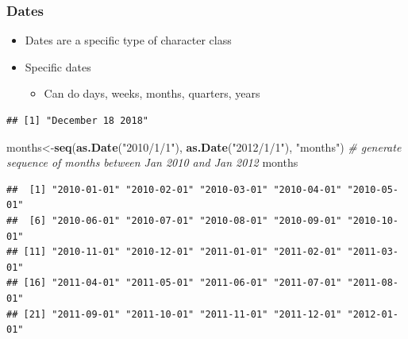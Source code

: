 \documentclass[]{book}
\newenvironment{Shaded}{\begin{snugshade}}{\end{snugshade}}
\newcommand{\KeywordTok}[1]{\textcolor[rgb]{0.13,0.29,0.53}{\textbf{#1}}}
\newcommand{\DataTypeTok}[1]{\textcolor[rgb]{0.13,0.29,0.53}{#1}}
\newcommand{\StringTok}[1]{\textcolor[rgb]{0.31,0.60,0.02}{#1}}
\newcommand{\CommentTok}[1]{\textcolor[rgb]{0.56,0.35,0.01}{\textit{#1}}}
\newcommand{\NormalTok}[1]{#1}
\providecommand{\tightlist}{%
  \setlength{\itemsep}{0pt}\setlength{\parskip}{0pt}}
\theoremstyle{definition}
\theoremstyle{definition}
\theoremstyle{definition}
\theoremstyle{remark}
\begin{document}
\subsubsection{Dates}\label{dates}

\begin{itemize}
\tightlist
\item
  Dates are a specific type of character class
\item
  Specific dates

  \begin{itemize}
  \tightlist
  \item
    Can do days, weeks, months, quarters, years
  \end{itemize}
\end{itemize}

\begin{Shaded}
\end{Shaded}

\begin{verbatim}
## [1] "December 18 2018"
\end{verbatim}

\begin{Shaded}
\begin{Highlighting}[]
\NormalTok{months<-}\KeywordTok{seq}\NormalTok{(}\KeywordTok{as.Date}\NormalTok{(}\StringTok{"2010/1/1"}\NormalTok{), }\KeywordTok{as.Date}\NormalTok{(}\StringTok{"2012/1/1"}\NormalTok{), }\StringTok{"months"}\NormalTok{) }\CommentTok{# generate sequence of months between Jan 2010 and Jan 2012}
\NormalTok{months}
\end{Highlighting}
\end{Shaded}

\begin{verbatim}
##  [1] "2010-01-01" "2010-02-01" "2010-03-01" "2010-04-01" "2010-05-01"
##  [6] "2010-06-01" "2010-07-01" "2010-08-01" "2010-09-01" "2010-10-01"
## [11] "2010-11-01" "2010-12-01" "2011-01-01" "2011-02-01" "2011-03-01"
## [16] "2011-04-01" "2011-05-01" "2011-06-01" "2011-07-01" "2011-08-01"
## [21] "2011-09-01" "2011-10-01" "2011-11-01" "2011-12-01" "2012-01-01"
\end{verbatim}
\end{document}

